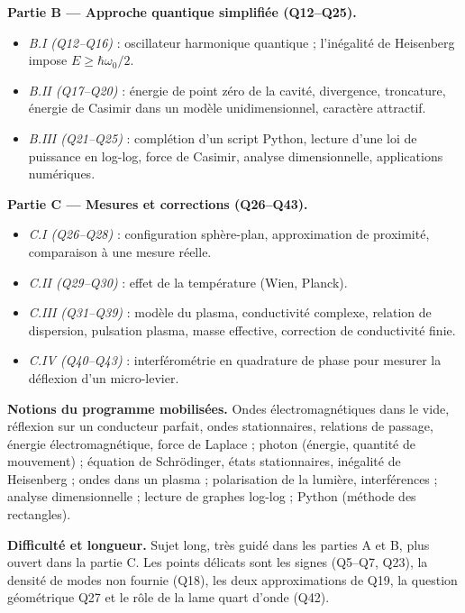 \documentclass[11pt,a4paper]{article}
\providecommand{\tightlist}{\setlength{\itemsep}{0pt}\setlength{\parskip}{0pt}}
\begin{document}
\textbf{Partie B --- Approche quantique simplifiée (Q12--Q25).}

\begin{itemize}
\tightlist
\item
  \emph{B.I (Q12--Q16)} : oscillateur harmonique quantique ; l'inégalité de Heisenberg impose \(E\geqslant\hbar\omega_0/2\).
\item
  \emph{B.II (Q17--Q20)} : énergie de point zéro de la cavité, divergence, troncature, énergie de Casimir dans un modèle unidimensionnel, caractère attractif.
\item
  \emph{B.III (Q21--Q25)} : complétion d'un script Python, lecture d'une loi de puissance en log-log, force de Casimir, analyse dimensionnelle, applications numériques.
\end{itemize}

\textbf{Partie C --- Mesures et corrections (Q26--Q43).}

\begin{itemize}
\tightlist
\item
  \emph{C.I (Q26--Q28)} : configuration sphère-plan, approximation de proximité, comparaison à une mesure réelle.
\item
  \emph{C.II (Q29--Q30)} : effet de la température (Wien, Planck).
\item
  \emph{C.III (Q31--Q39)} : modèle du plasma, conductivité complexe, relation de dispersion, pulsation plasma, masse effective, correction de conductivité finie.
\item
  \emph{C.IV (Q40--Q43)} : interférométrie en quadrature de phase pour mesurer la déflexion d'un micro-levier.
\end{itemize}

\textbf{Notions du programme mobilisées.} Ondes électromagnétiques dans le vide, réflexion sur un conducteur parfait, ondes stationnaires, relations de passage, énergie électromagnétique, force de Laplace ; photon (énergie, quantité de mouvement) ; équation de Schrödinger, états stationnaires, inégalité de Heisenberg ; ondes dans un plasma ; polarisation de la lumière, interférences ; analyse dimensionnelle ; lecture de graphes log-log ; Python (méthode des rectangles).

\textbf{Difficulté et longueur.} Sujet long, très guidé dans les parties A et B, plus ouvert dans la partie C. Les points délicats sont les signes (Q5--Q7, Q23), la densité de modes non fournie (Q18), les deux approximations de Q19, la question géométrique Q27 et le rôle de la lame quart d'onde (Q42).
\end{document}
